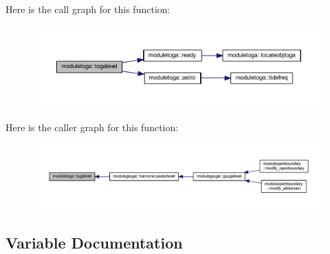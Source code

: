 Here is the call graph for this function\+:\nopagebreak
\begin{figure}[H]
\begin{center}
\leavevmode
\includegraphics[width=350pt]{namespacemoduletoga_a42e9e4f606a8d51d59a07cbe2c0a1299_cgraph}
\end{center}
\end{figure}
Here is the caller graph for this function\+:\nopagebreak
\begin{figure}[H]
\begin{center}
\leavevmode
\includegraphics[width=350pt]{namespacemoduletoga_a42e9e4f606a8d51d59a07cbe2c0a1299_icgraph}
\end{center}
\end{figure}


\subsection{Variable Documentation}
\mbox{\label{namespacemoduletoga_a720174d4c894836d1fe7779b313f49e6}} 
